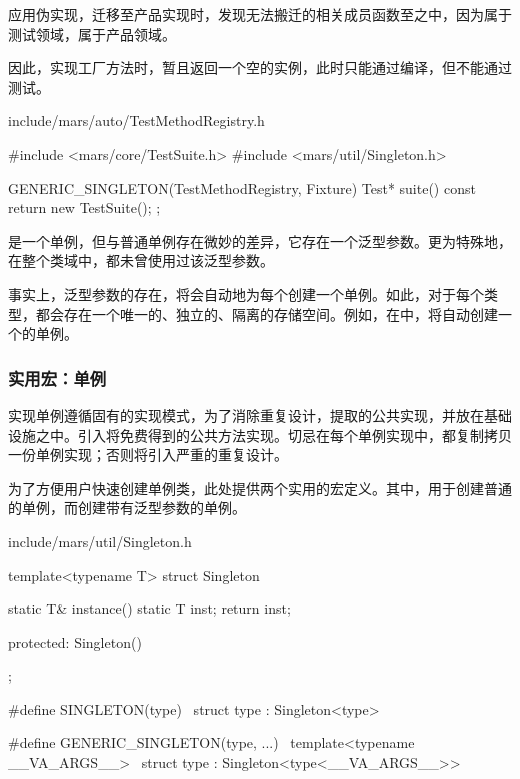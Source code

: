 \begin{content}
应用伪实现，迁移至产品实现时，发现无法搬迁的相关成员函数至之中，因为属于测试领域，属于产品领域。

因此，实现工厂方法时，暂且返回一个空的实例，此时只能通过编译，但不能通过测试。

\begin{nodiff}{include/mars/auto/TestMethodRegistry.h}
 \begin{c++}
#include <mars/core/TestSuite.h>
#include <mars/util/Singleton.h>

GENERIC_SINGLETON(TestMethodRegistry, Fixture) {
  Test* suite() const {
    return new TestSuite();
  }
};
 \end{c++}
\end{nodiff}

是一个单例，但与普通单例存在微妙的差异，它存在一个泛型参数。更为特殊地，在整个类域中，都未曾使用过该泛型参数。

事实上，泛型参数的存在，将会自动地为每个创建一个单例。如此，对于每个类型，都会存在一个唯一的、独立的、隔离的存储空间。例如，在中，将自动创建一个的单例。

\subsubsection{实用宏：单例}

实现单例遵循固有的实现模式，为了消除重复设计，提取的公共实现，并放在基础设施之中。引入将免费得到的公共方法实现。切忌在每个单例实现中，都复制拷贝一份单例实现；否则将引入严重的重复设计。

为了方便用户快速创建单例类，此处提供两个实用的宏定义。其中，用于创建普通的单例，而创建带有泛型参数的单例。

\begin{nodiff}{include/mars/util/Singleton.h}
 \begin{c++}
template<typename T>
struct Singleton {
  static T& instance() {
    static T inst;
    return inst;
  }

protected:
  Singleton() {}
};

#define SINGLETON(type) \
  struct type : Singleton<type>

#define GENERIC_SINGLETON(type, ...)         \
  template<typename __VA_ARGS__>             \
  struct type : Singleton<type<__VA_ARGS__>>
 \end{c++}
\end{nodiff}


\end{content}
